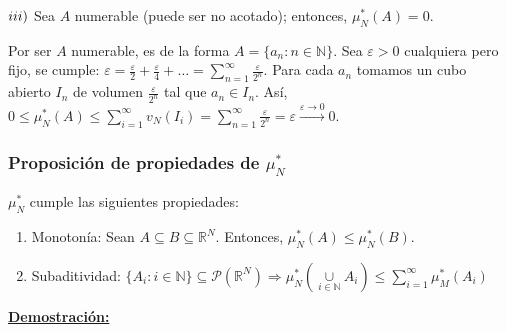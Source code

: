 \documentclass[12pt,a4paper]{article}
\newcommand{\R}{\mathbb{R}}
\newcommand{\N}{\mathbb{N}}
\newcommand{\smallcup}{\mathop{\cup}\limits}
\newcommand{\smallsum}{\mathop{\sum}\limits}
\newcounter{unit}[section]
\newcounter{chapter}[unit]
\renewcommand{\theunit}{\arabic{unit}}
\renewcommand{\thechapter}{\arabic{chapter}}
\renewcommand{\thesubsubsection}{\theunit.\thechapter.\arabic{subsubsection}}
\newcommand{\result}[1]{%
  \subsubsection{#1}%
  \label{result:\thesubsubsection}
}
\newcommand{\dem}{
    \noindent \underline{\textbf{Demostración:}}
}
\begin{document}
\vspace{4mm} \noindent
$\romannumeral 3)$ Sea $A$ numerable (puede ser no acotado); entonces, $\mu^*_N(A) = 0$.
\begin{adjustwidth}{0.07\textwidth}{}
    Por ser $A$ numerable, es de la forma $A = \{a_n : n \in \N\}$.
    \newline Sea $\varepsilon > 0$ cualquiera pero fijo, se cumple: $\varepsilon = \frac{\varepsilon}{2} + \frac{\varepsilon}{4} + \ldots = \smallsum_{n=1}^{\infty}\frac{\varepsilon}{2^n}$.
    \newline Para cada $a_n$ tomamos un cubo abierto $I_n$ de volumen $\frac{\varepsilon}{2^n}$ tal que $a_n \in I_n$.
    \newline Así, $0 \leq \mu^*_N(A) \leq \smallsum_{i=1}^{\infty}v_N(I_i) = \smallsum_{n=1}^{\infty}\frac{\varepsilon}{2^n} = \varepsilon \xrightarrow{\varepsilon \to 0}0$.
\end{adjustwidth}

\newpage
\result{Proposición de propiedades de \texorpdfstring{$\mu^*_N$}{mu\^*\_N}}
\hspace{1mm} $\mu^*_N$ cumple las siguientes propiedades:
\begin{enumerate}[label=\roman*)]
    \item Monotonía: Sean $A \subseteq B \subseteq \R^N$. Entonces, $\mu^*_N(A) \leq \mu^*_N(B)$.
    \item Subaditividad: $\{A_i : i \in \N\} \subseteq \mathcal{P}(\R^N) \Rightarrow \mu^*_N(\smallcup_{i\in\N}A_i) \leq \smallsum_{i=1}^{\infty}\mu^*_M(A_i)$
\end{enumerate}

\vspace{3mm} \dem
\end{document}
